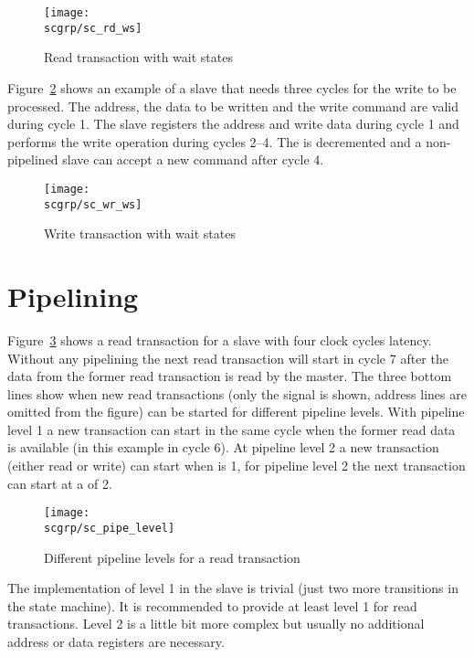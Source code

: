 \begin{figure}
    \centering
    \texttt{[image: \\scgrp/sc\_rd\_ws]}
    \caption{Read transaction with wait states}
    \label{fig:sc:rd:ws}
\end{figure}


Figure~\ref{fig:sc:wr:ws} shows an example of a slave that needs
three cycles for the write to be processed. The address, the data to
be written and the write command are valid during cycle 1. The slave
registers the address and write data during cycle 1 and performs the
write operation during cycles 2--4. The  is
decremented and a non-pipelined slave can accept a new command after
cycle 4.

\begin{figure}
    \centering
    \texttt{[image: \\scgrp/sc\_wr\_ws]}
    \caption{Write transaction with wait states}
    \label{fig:sc:wr:ws}
\end{figure}



\section{Pipelining}

Figure~\ref{fig:sc:pipe:level} shows a read transaction for a slave
with four clock cycles latency. Without any pipelining the next read
transaction will start in cycle 7 after the data from the former
read transaction is read by the master. The three bottom lines show
when new read transactions (only the  signal is shown,
address lines are omitted from the figure) can be started for
different pipeline levels. With pipeline level 1 a new transaction
can start in the same cycle when the former read data is available
(in this example in cycle 6). At pipeline level 2 a new transaction
(either read or write) can start when  is 1, for
pipeline level 2 the next transaction can start at a 
of 2.

\begin{figure}
    \centering
    \texttt{[image: \\scgrp/sc\_pipe\_level]}
    \caption{Different pipeline levels for a read transaction}
    \label{fig:sc:pipe:level}
\end{figure}

The implementation of level 1 in the slave is trivial (just two more
transitions in the state machine). It is recommended to provide  at
least level 1 for read transactions. Level 2 is a little bit more
complex but usually no additional address or data registers are
necessary.

